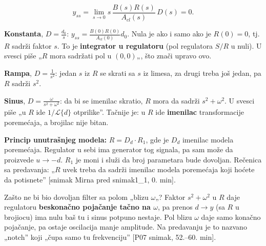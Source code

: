 \documentclass[11pt,a4paper,parskip=half,headsepline,numbers=noenddot]{scrartcl}
\DeclareRobustCommand{\izvor}[1]{{\small\color{izvorC}[#1]}}
\begin{document}
\[y_{ss} = \lim_{s\to 0} s\,\frac{B(s)R(s)}{A_{cl}(s)}\,D(s) = 0 .\]

\textbf{Konstanta}, \(D = \frac{d_0}{s}\): \(y_{ss} = \frac{B(0)R(0)}{A_{cl}(0)}d_0\). Nula je ako i samo ako je \(R(0) = 0\), tj. \(R\) sadrži faktor \(s\). To je \textbf{integrator u regulatoru} (pol regulatora \(S/R\) u nuli). U svesci piše „\(R\) mora sadržati pol u \((0,0)\)„, što znači upravo ovo.

\textbf{Rampa}, \(D = \frac{1}{s^2}\): jedan \(s\) iz \(R\) se skrati sa \(s\) iz limesa, za drugi treba još jedan, pa \(R\) sadrži \(s^2\).

\textbf{Sinus}, \(D = \frac{\omega}{s^2 + \omega^2}\): da bi se imenilac skratio, \(R\) mora da sadrži \(s^2 + \omega^2\). U svesci piše „u \(R\) ide \(1/\mathcal L\{d\}\) otprilike''. Tačnije je: u \(R\) ide \textbf{imenilac} transformacije poremećaja, a brojilac nije bitan.

\begin{kljucna}
\textbf{Princip unutrašnjeg modela:} \(R = D_d\cdot R_1\), gde je \(D_d\) imenilac modela poremećaja. Regulator u sebi ima generator tog signala, pa sam može da proizvede \(u \to -d\). \(R_1\) je moni i služi da broj parametara bude dovoljan. Rečenica sa predavanja: „\(R\) uvek treba da sadrži imenilac modela poremećaja koji hoćete da potisnete'' \izvor{snimak Mirna pred snimak1\_1, 0. min}.
\end{kljucna}

\begin{zasto}
Zašto ne bi bio dovoljan filter sa polom „blizu \(\omega\)„? Faktor \(s^2 + \omega^2\) u \(R\) daje regulatoru \textbf{beskonačno pojačanje tačno na \(\omega\)}, pa prenos \(d \to y\) (sa \(R\) u brojiocu) ima nulu baš tu i sinus potpuno nestaje. Pol blizu \(\omega\) daje samo konačno pojačanje, pa ostaje oscilacija manje amplitude. Na predavanju je to nazvano „notch'' koji „čupa samo tu frekvenciju'' \izvor{P07 snimak, 52.--60. min}.
\end{zasto}
\end{document}
